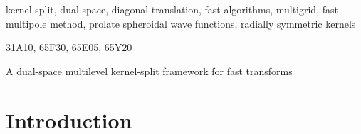 \documentclass[final,letterpaper]{siamart171218}
\begin{document}
\begin{keywords}
  kernel split, dual space, diagonal translation,
  fast algorithms, multigrid, fast multipole method,
  prolate spheroidal wave functions,
  radially symmetric kernels
\end{keywords}


\begin{AMS}
31A10, 65F30, 65E05, 65Y20
\end{AMS}

\pagestyle{myheadings}
\thispagestyle{plain}
{A dual-space multilevel kernel-split framework for fast transforms}


%
%
%

\section{Introduction}\label{intro}
\end{document}
